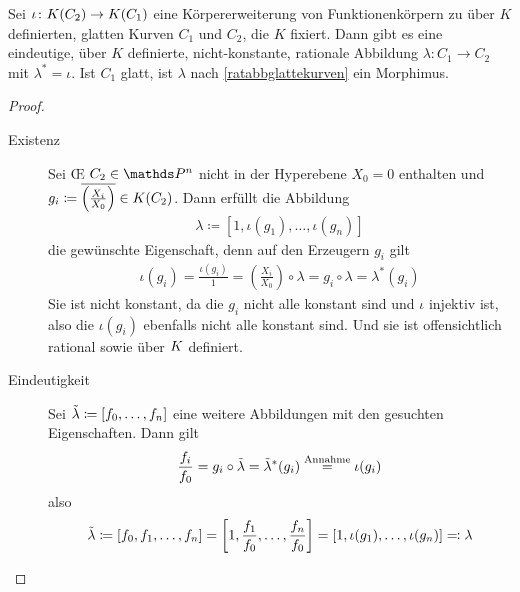 \begin{Lemma}\label{erweiterungzuratabb}
  Sei $\iota\colon K(C_2)\to K(C_1)$ eine Körpererweiterung von
  Funktionenkörpern zu über $K$ definierten, glatten Kurven $C_1$ und
  $C_2$, die $K$ fixiert. Dann gibt es eine 
  eindeutige, über $K$ definierte, nicht-konstante, rationale
  Abbildung $\lambda\colon C_1\to C_2$ mit $\lambda^* = \iota$.
  Ist $C_1$ glatt, ist $\lambda$ nach \autoref{ratabbglattekurven}
  ein Morphimus.
  \begin{proof}
    \begin{description}
      \item[Existenz] Sei \OE{} $C_2\in\P^n$ nicht in der Hyperebene
        $X_0=0$ enthalten und
        $g_i\coloneqq\overline{\left(\frac{X_i}{X_0}\right)}\in K(C_2)$.
        Dann erfüllt die Abbildung
        \begin{gather*}
          \lambda\coloneqq \left[1, \iota(g_1),\dotsc,\iota(g_n)\right]
        \end{gather*}
        die gewünschte Eigenschaft, denn auf den Erzeugern $g_i$ gilt
        \begin{gather*}
          \iota(g_i) 
          = \frac{\iota(g_i)}{1} 
          = \left(\frac{X_i}{X_0}\right)\circ\lambda
          = g_i\circ\lambda
          = \lambda^*(g_i)
        \end{gather*}
        Sie ist nicht konstant, da die
        $g_i$ nicht alle konstant sind und $\iota$ injektiv ist, also
        die $\iota(g_i)$ ebenfalls nicht alle konstant sind. Und sie
        ist offensichtlich rational sowie über $K$ definiert.
      \item[Eindeutigkeit]
        Sei $\tilde\lambda\coloneqq[f_0,\dotsc,f_n]$ eine weitere
        Abbildungen mit den gesuchten Eigenschaften.
        Dann gilt
        \begin{gather*}
          \frac{f_i}{f_0}
          = g_i\circ\tilde\lambda
          = \tilde\lambda^*(g_i) 
          \overset{\text{Annahme}}{=}
          \iota(g_i)
        \end{gather*}
        also 
        \begin{gather*}
          \tilde\lambda
          \coloneqq \left[ f_0,f_1,\dotsc,f_n \right]
          = \left[ 1, \frac{f_1}{f_0}, \dotsc, \frac{f_n}{f_0}\right]
          = \left[ 1, \iota(g_1), \dotsc, \iota(g_n) \right]
          \eqqcolon \lambda
        \end{gather*}
    \end{description}
  \end{proof}
\end{Lemma}

